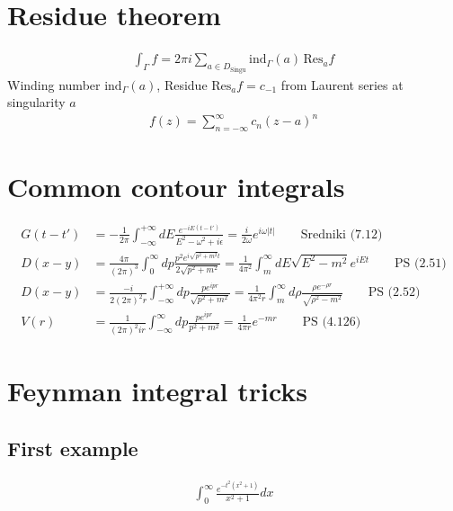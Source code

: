 \documentclass[../main.tex]{subfiles}
\begin{document}
\section{Residue theorem}
\begin{align}
\int_\Gamma f=2\pi i\sum_{a\in D_\text{Singu}}\text{ind}_\Gamma(a)\,\text{Res}_af
\end{align}
Winding number $\text{ind}_\Gamma(a)$, Residue $\text{Res}_af=c_{-1}$ from Laurent series at singularity $a$
\begin{align}
f(z)=\sum_{n=-\infty}^\infty c_n(z-a)^n
\end{align}


\section{Common contour integrals}
\begin{align}
G(t-t')&=-\frac{1}{2\pi}\int_{-\infty}^{+\infty}dE\frac{e^{-iE(t-t')}}{E^2-\omega^2+i\epsilon}=\frac{i}{2\omega}e^{i\omega|t|}\qquad\text{Sredniki (7.12)}\\
D(x-y)&=\frac{4\pi}{(2\pi)^3}\int_{0}^{\infty} dp\frac{p^2 e^{i\sqrt{p^2+m^2}t}}{2\sqrt{p^2+m^2}}=\frac{1}{4\pi^2}\int_m^\infty dE\sqrt{E^2-m^2}e^{iEt}\qquad \text{PS (2.51)}\\
D(x-y)&=\frac{-i}{2(2\pi)^2r}\int_{-\infty}^{+\infty} dp\frac{p e^{ipr}}{\sqrt{p^2+m^2}}=\frac{1}{4\pi^2 r}\int_m^\infty d\rho\frac{\rho e^{-\rho r}}{\sqrt{\rho^2-m^2}}\qquad\text{PS (2.52)}\\
V(r)&=\frac{1}{(2\pi)^2ir}\int_{-\infty}^\infty dp\frac{p e^{ipr}}{p^2+m^2}=\frac{1}{4\pi r}e^{-mr}\qquad\text{PS (4.126)}
\end{align}

\section{Feynman integral tricks}
\subsection{First example}
\begin{align}
\int_{0}^{\infty}\frac{e^{-t^2(x^2+1)}}{x^2+1}dx
\end{align}
\end{document}

